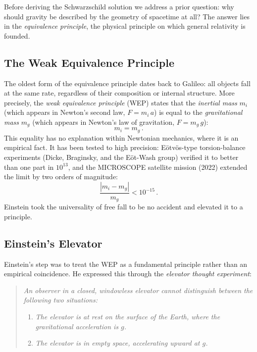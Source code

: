 Before deriving the Schwarzschild solution we address a prior
question: why should gravity be described
by the geometry of spacetime at all?  The answer lies in the
\emph{equivalence principle}, the physical principle on which general
relativity is founded.

\subsection{The Weak Equivalence Principle}
\label{sec:weak_equivalence}

The oldest form of the equivalence principle dates back to Galileo:
all objects fall at the same rate, regardless of their
composition or internal structure.  More precisely, the
\emph{weak equivalence principle} (WEP) states that the
\emph{inertial mass} $m_i$ (which appears in Newton's second law,
$F = m_i\, a$) is equal to the \emph{gravitational mass} $m_g$
(which appears in Newton's law of gravitation, $F = m_g\, g$):
\begin{equation}
    m_i = m_g \,.
    \label{eq:wep}
\end{equation}
This equality has no explanation within Newtonian mechanics, where it is
an empirical fact.  It has been tested to high
precision: E\"otv\"os-type torsion-balance experiments (Dicke,
Braginsky, and the E\"ot-Wash group) verified it to better than one
part in $10^{13}$, and the MICROSCOPE satellite mission (2022) extended
the limit by two orders of magnitude:
\begin{equation}
    \frac{|m_i - m_g|}{m_g} < 10^{-15} \,.
    \label{eq:wep_precision}
\end{equation}
Einstein took the universality of free fall to be no accident and
elevated it to a principle.

\subsection{Einstein's Elevator}
\label{sec:einstein_elevator}

Einstein's step was to treat the WEP as a
fundamental principle rather than an empirical coincidence.  He
expressed this through the \emph{elevator thought experiment}:

\begin{quote}
\textit{An observer in a closed, windowless elevator cannot distinguish
between the following two situations:}
\begin{enumerate}[nosep]
    \item[(a)] \textit{The elevator is at rest on the surface of the Earth,
    where the gravitational acceleration is $g$.}
    \item[(b)] \textit{The elevator is in empty space, accelerating
    upward at $g$.}
\end{enumerate}
\end{quote}

